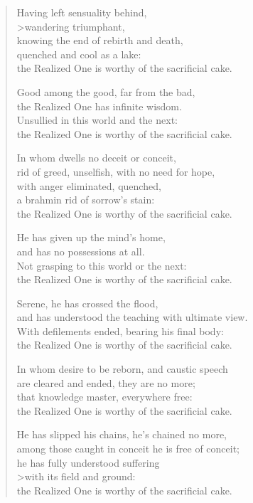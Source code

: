 \documentclass[12pt,openany]{book}%
\begin{document}
\begin{verse}
Having left sensuality behind, \\>wandering triumphant, \\
knowing the end of rebirth and death, \\
quenched and cool as a lake: \\
the Realized One is worthy of the sacrificial cake. 

Good among the good, far from the bad, \\
the Realized One has infinite wisdom. \\
Unsullied in this world and the next: \\
the Realized One is worthy of the sacrificial cake. 

In whom dwells no deceit or conceit, \\
rid of greed, unselfish, with no need for hope, \\
with anger eliminated, quenched, \\
a brahmin rid of sorrow’s stain: \\
the Realized One is worthy of the sacrificial cake. 

He has given up the mind’s home, \\
and has no possessions at all. \\
Not grasping to this world or the next: \\
the Realized One is worthy of the sacrificial cake. 

Serene, he has crossed the flood, \\
and has understood the teaching with ultimate view. \\
With defilements ended, bearing his final body: \\
the Realized One is worthy of the sacrificial cake. 

In whom desire to be reborn, and caustic speech \\
are cleared and ended, they are no more; \\
that knowledge master, everywhere free: \\
the Realized One is worthy of the sacrificial cake. 

He has slipped his chains, he’s chained no more, \\
among those caught in conceit he is free of conceit; \\
he has fully understood suffering \\>with its field and ground: \\
the Realized One is worthy of the sacrificial cake. 


\end{verse}
\end{document}
